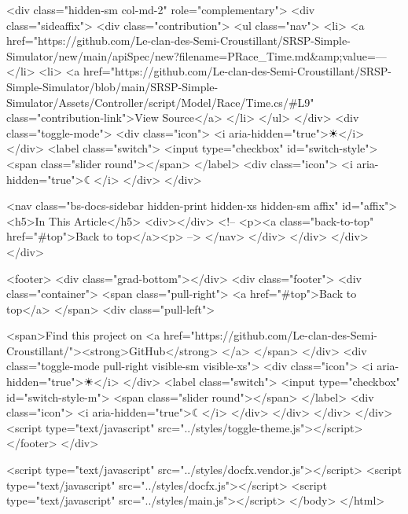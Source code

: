           <div class="hidden-sm col-md-2" role="complementary">
            <div class="sideaffix">
              <div class="contribution">
                <ul class="nav">
                  <li>
                    <a href="https://github.com/Le-clan-des-Semi-Croustillant/SRSP-Simple-Simulator/new/main/apiSpec/new?filename=PRace_Time.md&amp;value=---%
                  </li>
                  <li>
                    <a href="https://github.com/Le-clan-des-Semi-Croustillant/SRSP-Simple-Simulator/blob/main/SRSP-Simple-Simulator/Assets/Controller/script/Model/Race/Time.cs/#L9" class="contribution-link">View Source</a>
                  </li>
                </ul>
              </div>
              <div class="toggle-mode">
                <div class="icon">
                  <i aria-hidden="true">☀</i>
                </div>
                <label class="switch">
                  <input type="checkbox" id="switch-style">
                  <span class="slider round"></span>
                </label>
                <div class="icon">
                  <i aria-hidden="true">☾</i>
                </div>
              </div>
          
              <nav class="bs-docs-sidebar hidden-print hidden-xs hidden-sm affix" id="affix">
              <h5>In This Article</h5>
              <div></div>
              <!-- <p><a class="back-to-top" href="#top">Back to top</a><p> -->
              </nav>
            </div>
          </div>
        </div>
      </div>
      
      <footer>
        <div class="grad-bottom"></div>
        <div class="footer">
          <div class="container">
            <span class="pull-right">
              <a href="#top">Back to top</a>
            </span>
            <div class="pull-left">
              
              <span>Find this project on <a href="https://github.com/Le-clan-des-Semi-Croustillant/"><strong>GitHub</strong> </a>
              </span> 
            </div>
            <div class="toggle-mode pull-right visible-sm visible-xs">
              <div class="icon">
                <i aria-hidden="true">☀</i>
              </div>
              <label class="switch">
                <input type="checkbox" id="switch-style-m">
                <span class="slider round"></span>
              </label>
              <div class="icon">
                <i aria-hidden="true">☾</i>
              </div>
            </div>
          </div>
        </div>
        <script type="text/javascript" src="../styles/toggle-theme.js"></script>
      </footer>    </div>
    
    <script type="text/javascript" src="../styles/docfx.vendor.js"></script>
    <script type="text/javascript" src="../styles/docfx.js"></script>
    <script type="text/javascript" src="../styles/main.js"></script>
  </body>
</html>
